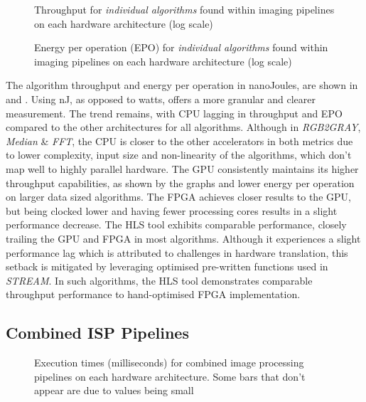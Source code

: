 \begin{figure}[tb]
    \centering
\resizebox{\columnwidth}{!}{}    
    \caption[Individual Algorithm Throughput]{{Throughput for \textit{individual algorithms} found within imaging pipelines on each hardware architecture (log scale)}}
    \label{fig:CHAP1OtherAlgorithmsThroughput}
\end{figure}


\begin{figure}[tb]
    \centering
\resizebox{\columnwidth}{!}{}    
    \caption[Individual Algorithm EPO]{{ Energy per operation (EPO) for \textit{individual algorithms} found within imaging pipelines on each hardware architecture (log scale)}}
    \label{fig:CHAP1OtherAlgorithmsEPO}
\end{figure}

The algorithm throughput and energy per operation in nanoJoules, are shown in  and . Using nJ, as opposed to watts, offers a more granular and clearer measurement. The trend remains, with CPU lagging in throughput and EPO compared to the other architectures for all algorithms. Although in \textit{RGB2GRAY}, \textit{Median} \& \textit{FFT}, the CPU is closer to the other accelerators in both metrics due to lower complexity, input size and non-linearity of the algorithms, which don't map well to highly parallel hardware. The GPU consistently maintains its higher throughput capabilities, as shown by the graphs and lower energy per operation on larger data sized algorithms. The FPGA achieves closer results to the GPU, but being clocked lower and having fewer processing cores results in a slight performance decrease. The HLS tool exhibits comparable performance, closely trailing the GPU and FPGA in most algorithms. Although it experiences a slight performance lag which is attributed to challenges in hardware translation, this setback is mitigated by leveraging optimised pre-written functions used in \textit{STREAM}. In such algorithms, the HLS tool demonstrates comparable throughput performance to hand-optimised FPGA implementation.




\subsection{Combined ISP Pipelines}
\begin{figure}[t]
    \centering
\resizebox{\columnwidth}{!}{}    %
    \caption[Combined Algorithm Runtime]{{Execution times (milliseconds) for combined image processing pipelines on each hardware architecture. Some bars that don't appear are due to values being small}}
    \label{fig:Execution}
\end{figure}


